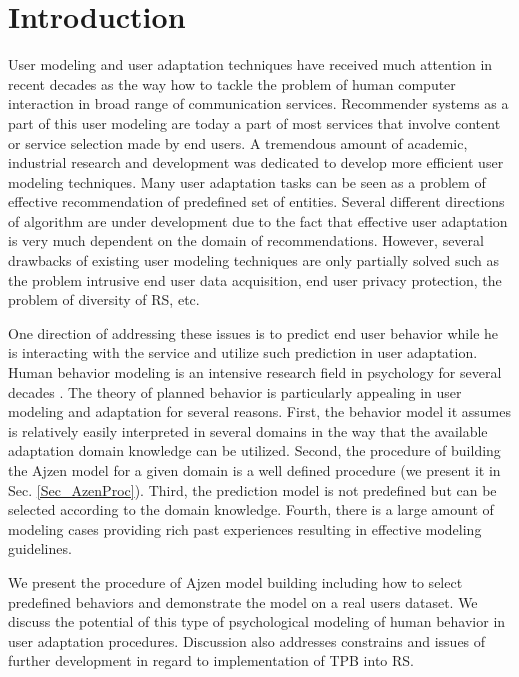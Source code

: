 \documentclass{llncs}
\begin{document}
\section{Introduction}\label{Sec_Intro} 

User modeling and user adaptation techniques have received much attention in recent decades as the way how to tackle the problem of human computer interaction in broad range of communication services. Recommender systems as a part of this user modeling are today a part of most services that involve content or service selection made by end users. A tremendous amount of academic, industrial research and development was dedicated to develop more efficient user modeling techniques. Many user adaptation tasks can be seen as a problem of effective recommendation of predefined set of entities. Several different directions of algorithm are under development due to the fact that effective user adaptation is very much dependent on the domain of recommendations. However, several drawbacks of existing user modeling techniques are only partially solved such as the problem intrusive end user data acquisition, end user privacy protection, the problem of diversity of RS, etc.

One direction of addressing these issues is to predict end user behavior while he is interacting with the service and utilize such prediction in user adaptation. Human behavior modeling is an intensive research field in psychology for several decades \cite{Martin200703}. The theory of planned behavior \cite{AjzenWebPage} is particularly appealing in user modeling and adaptation for several reasons. First, the behavior model it assumes is relatively easily interpreted in several domains in the way that the available adaptation domain knowledge can be utilized. Second, the procedure of building the Ajzen model for a given domain is a well defined procedure (we present it in Sec. \ref{Sec_AzenProc}). Third, the prediction model is not predefined but can be selected according to the domain knowledge. Fourth, there is a large amount of modeling cases providing rich past experiences resulting in effective modeling guidelines.  

We present the procedure of Ajzen model building including how to select predefined behaviors and demonstrate the model on a real users dataset. We discuss the potential of this type of psychological modeling of human behavior in user adaptation procedures. Discussion also addresses constrains and issues of further development in regard to implementation of TPB into RS.
\end{document}
